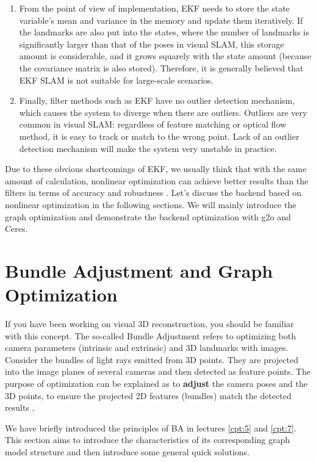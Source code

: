 \begin{enumerate}
	\item 
	From the point of view of implementation, EKF needs to store the state variable's mean and variance in the memory and update them iteratively. If the landmarks are also put into the states, where the number of landmarks is significantly larger than that of the poses in visual SLAM, this storage amount is considerable, and it grows squarely with the state amount (because the covariance matrix is also ​​stored). Therefore, it is generally believed that EKF SLAM is not suitable for large-scale scenarios.
	
	\item 
	Finally, filter methods such as EKF have no outlier detection mechanism, which causes the system to diverge when there are outliers. Outliers are very common in visual SLAM: regardless of feature matching or optical flow method, it is easy to track or match to the wrong point. Lack of an outlier detection mechanism will make the system very unstable in practice.
\end{enumerate}

Due to these obvious shortcomings of EKF, we usually think that with the same amount of calculation, nonlinear optimization can achieve better results than the filters in terms of accuracy and robustness \textsuperscript{\cite{Strasdat2012}}. Let's discuss the backend based on nonlinear optimization in the following sections. We will mainly introduce the graph optimization and demonstrate the backend optimization with g2o and Ceres.

\section{Bundle Adjustment and Graph Optimization}
If you have been working on visual 3D reconstruction, you should be familiar with this concept. The so-called Bundle Adjustment refers to optimizing both camera parameters (intrinsic and extrinsic) and 3D landmarks with images. Consider the bundles of light rays emitted from 3D points. They are projected into the image planes of several cameras and then detected as feature points. The purpose of optimization can be explained as to \textbf{adjust} the camera poses and the 3D points, to ensure the projected 2D features (bundles) match the detected results {\cite{Triggs2000}}.

We have briefly introduced the principles of BA in lectures \ref{cpt:5} and \ref{cpt:7}. This section aims to introduce the characteristics of its corresponding graph model structure and then introduce some general quick solutions.

